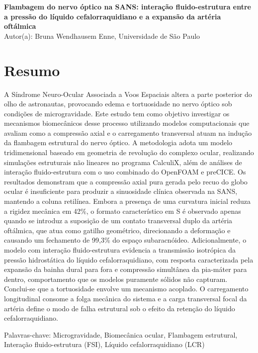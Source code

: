 \documentclass[article, hidelinks,oneside,12pt]{abntex2}
\begin{document}
\begin{center}
\textbf{Flambagem do nervo óptico na SANS: interação fluido-estrutura entre a pressão do líquido cefalorraquidiano e a expansão da artéria oftálmica}
\\
Autor(a): Bruna Wendhausem Enne, Universidade de São Paulo
\\
\end{center}

\section*{Resumo}

A Síndrome Neuro-Ocular Associada a Voos Espaciais altera a parte posterior do olho de astronautas, provocando edema e tortuosidade no nervo óptico sob condições de microgravidade. Este estudo tem como objetivo investigar os mecanismos biomecânicos desse processo utilizando modelos computacionais que avaliam como a compressão axial e o carregamento transversal atuam na indução da flambagem estrutural do nervo óptico. A metodologia adota um modelo tridimensional baseado em geometria de revolução do complexo ocular, realizando simulações estruturais não lineares no programa CalculiX, além de análises de interação fluido-estrutura com o uso combinado do OpenFOAM e preCICE. Os resultados demonstram que a compressão axial pura gerada pelo recuo do globo ocular é insuficiente para produzir a sinuosidade clínica observada na SANS, mantendo a coluna retilínea. Embora a presença de uma curvatura inicial reduza a rigidez mecânica em 42\%, o formato característico em S é observado apenas quando se introduz a suposição de um contato transversal duplo da artéria oftálmica, que atua como gatilho geométrico, direcionando a deformação e causando um fechamento de 99,3\% do espaço subaracnóideo. Adicionalmente, o modelo com interação fluido-estrutura evidencia a transmissão isotrópica da pressão hidrostática do líquido cefalorraquidiano, com resposta caracterizada pela expansão da bainha dural para fora e compressão simultânea da pia-máter para dentro, comportamento que os modelos puramente sólidos não capturam. Conclui-se que a tortuosidade envolve um mecanismo acoplado. O carregamento longitudinal consome a folga mecânica do sistema e a carga transversal focal da artéria define o modo de falha estrutural sob o efeito da retenção do líquido cefalorraquidiano.

Palavras-chave: Microgravidade, Biomecânica ocular, Flambagem estrutural, Interação fluido-estrutura (FSI), Líquido cefalorraquidiano (LCR)
\end{document}
